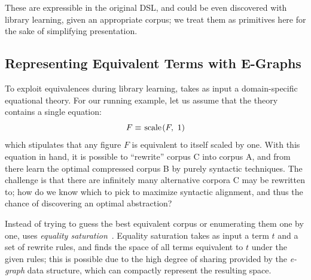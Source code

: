 \noindent
These are expressible in the original DSL,
  and could be even discovered with library learning,
  given an appropriate corpus;
  we treat them as primitives here
  for the sake of simplifying presentation.
  

\subsection{Representing Equivalent Terms with E-Graphs}

To exploit equivalences during library learning,
  \tool takes as input a domain-specific equational theory.
%
For our running example,
  let us assume that the theory contains a single equation:
\begin{equation}
  F \semeq \scale{F}{1} \label{eq:unit-xform}
\end{equation}
  which stipulates that any figure $F$
  is equivalent to itself 
  scaled by one.
%
With this equation in hand,
  it is possible to ``rewrite'' corpus C into corpus A,
  and from there learn the optimal compressed corpus B
  by purely syntactic techniques.
%
The challenge
  is that there are infinitely many
  alternative corpora C may be rewritten to;
  how do we know which to pick to maximize syntactic alignment,
  and thus the chance of discovering an optimal abstraction?

Instead of trying to guess
  the best equivalent corpus
  or enumerating them one by one,
  \tool uses \emph{equality saturation}~\cite{tate2009equality,willsey2021egg}.
%
Equality saturation takes as input
  a term $t$ and a set of rewrite rules,
  and finds the space of all terms equivalent
  to $t$ under the given rules;
  this is possible due to the high degree of
  sharing provided by the \emph{e-graph} data structure,
  which can compactly represent the resulting space.


